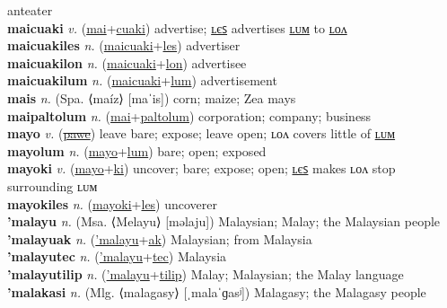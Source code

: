 anteater \label{maihnyamamamul} \\
\textbf{maicuaki} \textit{v.} (\hyperref[mai]{mai}+\hyperref[cuaki]{cuaki})
advertise; \hyperref[maicuakiles]{ʟєꜱ} advertises \hyperref[maicuakilum]{ʟᴜᴍ} to \hyperref[maicuakilon]{ʟᴏᴧ} \label{maicuaki} \\
\textbf{maicuakiles} \textit{n.} (\hyperref[maicuaki]{maicuaki}+\hyperref[les]{les})
advertiser \label{maicuakiles} \\
\textbf{maicuakilon} \textit{n.} (\hyperref[maicuaki]{maicuaki}+\hyperref[lon]{lon})
advertisee \label{maicuakilon} \\
\textbf{maicuakilum} \textit{n.} (\hyperref[maicuaki]{maicuaki}+\hyperref[lum]{lum})
advertisement \label{maicuakilum} \\
\textbf{mais} \textit{n.} (Spa. ⟨maíz⟩ [maˈis])
corn; maize; Zea mays \label{mais} \\
\textbf{maipaltolum} \textit{n.} (\hyperref[mai]{mai}+\hyperref[paltolum]{paltolum})
corporation; company; business \label{maipaltolum} \\
\textbf{mayo} \textit{v.} (\hyperref[pawe]{\sout{pawe}})
leave bare; expose; leave open; ʟᴏᴧ covers little of \hyperref[mayolum]{ʟᴜᴍ} \label{mayo} \\
\textbf{mayolum} \textit{n.} (\hyperref[mayo]{mayo}+\hyperref[lum]{lum})
bare; open; exposed \label{mayolum} \\
\textbf{mayoki} \textit{v.} (\hyperref[mayo]{mayo}+\hyperref[ki]{ki})
uncover; bare; expose; open; \hyperref[mayokiles]{ʟєꜱ} makes ʟᴏᴧ stop surrounding ʟᴜᴍ \label{mayoki} \\
\textbf{mayokiles} \textit{n.} (\hyperref[mayoki]{mayoki}+\hyperref[les]{les})
uncoverer \label{mayokiles} \\
\textbf{'malayu} \textit{n.} (Msa. ⟨Melayu⟩ [məlaju])
Malaysian; Malay; the Malaysian people \label{'malayu} \\
\textbf{'malayuak} \textit{n.} (\hyperref['malayu]{'malayu}+\hyperref[ak]{ak})
Malaysian; from Malaysia \label{'malayuak} \\
\textbf{'malayutec} \textit{n.} (\hyperref['malayu]{'malayu}+\hyperref[tec]{tec})
Malaysia \label{'malayutec} \\
\textbf{'malayutilip} \textit{n.} (\hyperref['malayu]{'malayu}+\hyperref[tilip]{tilip})
Malay; Malaysian; the Malay language \label{'malayutilip} \\
\textbf{'malakasi} \textit{n.} (Mlg. ⟨malagasy⟩ [ˌmalaˈɡasʲ])
Malagasy; the Malagasy people \label{'malakasi} \\
